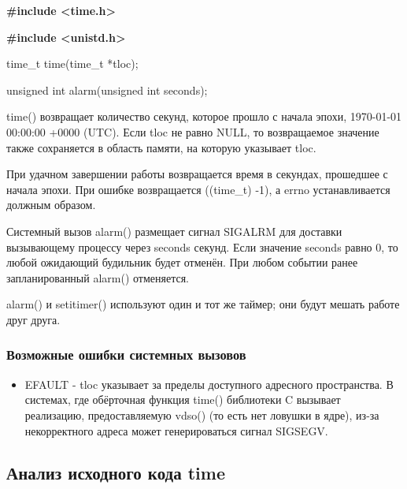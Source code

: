 \begin{center}
    \item \textbf{\#include <time.h>}
    \item \textbf{\#include <unistd.h>}
\end{center}

\begin{center}
    \item time\_t time(time\_t *tloc); 
    \item unsigned int alarm(unsigned int seconds);
\end{center}

\par time() возвращает количество секунд, которое прошло с начала эпохи, 1970-01-01 00:00:00 +0000 (UTC). Если tloc не равно NULL, то возвращаемое значение также сохраняется в область памяти, на которую указывает tloc. \\

\par При удачном завершении работы возвращается время в секундах, прошедшее с начала эпохи. При ошибке возвращается ((time\_t) -1), а errno устанавливается должным образом. \\


\par Системный вызов alarm() размещает сигнал SIGALRM для доставки вызывающему процессу через seconds секунд.
Если значение seconds равно 0, то любой ожидающий будильник будет отменён.
При любом событии ранее запланированный alarm() отменяется. \\

\par alarm() и setitimer() используют один и тот же таймер; они будут мешать работе друг друга.

\subsubsection{Возможные ошибки системных вызовов}

\begin{itemize}
    \item EFAULT - tloc указывает за пределы доступного адресного пространства. В системах, где обёрточная функция time() библиотеки C вызывает реализацию, предоставляемую vdso() (то есть нет ловушки в ядре), из-за некорректного адреса может генерироваться сигнал SIGSEGV.
\end{itemize}


\subsection{Анализ исходного кода time} %

